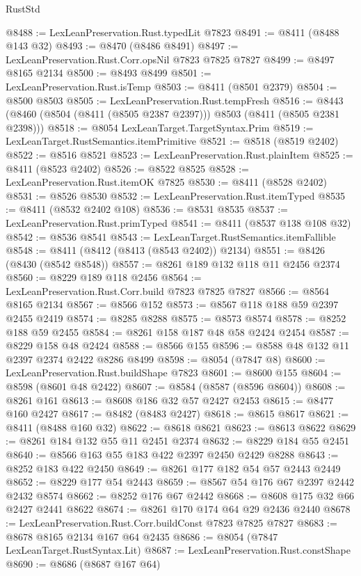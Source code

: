 \begin{lexlean}{RustStd}
\begin{coremodule}
@8488 := LexLeanPreservation.Rust.typedLit @7823
@8491 := @8411 (@8488 @143 @32)
@8493 := @8470 (@8486 @8491)
@8497 := LexLeanPreservation.Rust.Corr.opsNil @7823 @7825 @7827
@8499 := @8497 @8165 @2134
@8500 := @8493 @8499
@8501 := LexLeanPreservation.Rust.isTemp
@8503 := @8411 (@8501 @2379)
@8504 := @8500 @8503
@8505 := LexLeanPreservation.Rust.tempFresh
@8516 := @8443 (@8460 (@8504 (@8411 (@8505 @2387 @2397))) @8503 (@8411 (@8505 @2381 @2398)))
@8518 := @8054 LexLeanTarget.TargetSyntax.Prim
@8519 := LexLeanTarget.RustSemantics.itemPrimitive
@8521 := @8518 (@8519 @2402)
@8522 := @8516 @8521
@8523 := LexLeanPreservation.Rust.plainItem
@8525 := @8411 (@8523 @2402)
@8526 := @8522 @8525
@8528 := LexLeanPreservation.Rust.itemOK @7825
@8530 := @8411 (@8528 @2402)
@8531 := @8526 @8530
@8532 := LexLeanPreservation.Rust.itemTyped
@8535 := @8411 (@8532 @2402 @108)
@8536 := @8531 @8535
@8537 := LexLeanPreservation.Rust.primTyped
@8541 := @8411 (@8537 @138 @108 @32)
@8542 := @8536 @8541
@8543 := LexLeanTarget.RustSemantics.itemFallible
@8548 := @8411 (@8412 (@8413 (@8543 @2402)) @2134)
@8551 := @8426 (@8430 (@8542 @8548))
@8557 := @8261 @189 @132 @118 @11 @2456 @2374
@8560 := @8229 @189 @118 @2456
@8564 := LexLeanPreservation.Rust.Corr.build @7823 @7825 @7827
@8566 := @8564 @8165 @2134
@8567 := @8566 @152
@8573 := @8567 @118 @188 @59 @2397 @2455 @2419
@8574 := @8285 @8288
@8575 := @8573 @8574
@8578 := @8252 @188 @59 @2455
@8584 := @8261 @158 @187 @48 @58 @2424 @2454
@8587 := @8229 @158 @48 @2424
@8588 := @8566 @155
@8596 := @8588 @48 @132 @11 @2397 @2374 @2422 @8286 @8499
@8598 := @8054 (@7847 @8)
@8600 := LexLeanPreservation.Rust.buildShape @7823
@8601 := @8600 @155
@8604 := @8598 (@8601 @48 @2422)
@8607 := @8584 (@8587 (@8596 @8604))
@8608 := @8261 @161
@8613 := @8608 @186 @32 @57 @2427 @2453
@8615 := @8477 @160 @2427
@8617 := @8482 (@8483 @2427)
@8618 := @8615 @8617
@8621 := @8411 (@8488 @160 @32)
@8622 := @8618 @8621
@8623 := @8613 @8622
@8629 := @8261 @184 @132 @55 @11 @2451 @2374
@8632 := @8229 @184 @55 @2451
@8640 := @8566 @163 @55 @183 @422 @2397 @2450 @2429 @8288
@8643 := @8252 @183 @422 @2450
@8649 := @8261 @177 @182 @54 @57 @2443 @2449
@8652 := @8229 @177 @54 @2443
@8659 := @8567 @54 @176 @67 @2397 @2442 @2432 @8574
@8662 := @8252 @176 @67 @2442
@8668 := @8608 @175 @32 @66 @2427 @2441 @8622
@8674 := @8261 @170 @174 @64 @29 @2436 @2440
@8678 := LexLeanPreservation.Rust.Corr.buildConst @7823 @7825 @7827
@8683 := @8678 @8165 @2134 @167 @64 @2435
@8686 := @8054 (@7847 LexLeanTarget.RustSyntax.Lit)
@8687 := LexLeanPreservation.Rust.constShape
@8690 := @8686 (@8687 @167 @64)

\end{coremodule}
\end{lexlean}

